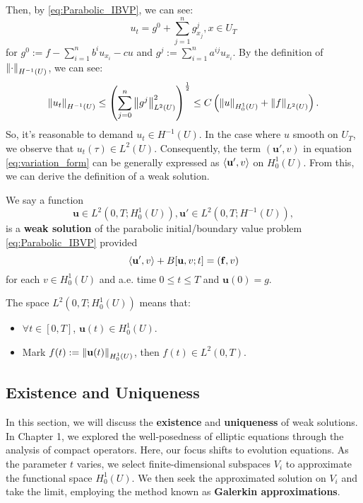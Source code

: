 Then, by \eqref{eq:Parabolic_IBVP}, we can see:
\begin{equation}
    u_{t}=g^{0}+\sum_{j=1}^{n}g_{x_{j}}^{j},x\in U_{T}
\end{equation}
for $g^{0}:=f-\sum_{i=1}^{n}b^{i}u_{x_{i}}-cu$ and $g^{j}:=\sum_{i=1}^{n}a^{ij}u_{x_{i}}$. By the definition of $\left\|\cdot\right\|_{H^{-1}(U)}$, we can see:
\begin{equation}
    \left\|u_{t}\right\|_{H^{-1}(U)}\le\left(\sum_{j=0}^{n}\left\|g^{j}\right\|_{L^{2}(U)}^{2}\right)^{\frac{1}{2}}\le C\left(\left\|u\right\|_{H_{0}^{1}(U)}+\left\|f\right\|_{L^{2}(U)}\right).
\end{equation}
So, it's reasonable to demand $u_{t}\in H^{-1}(U)$. In the case where $u$ smooth on $U_{T}$, we observe that $u_{t}(\tau)\in L^{2}(U)$. Consequently, the term $(\mathbf{u}',v)$ in equation \eqref{eq:variation_form} can be generally expressed as $\left<\mathbf{u}',v\right>$ on $H_{0}^{1}(U)$. From this, we can derive the definition of a weak solution.
\begin{definition}
    \label{defn:weak_sol_for_parabolic}
    We say a function 
    \begin{equation}
        \mathbf{u}\in L^{2}(0,T;H_{0}^{1}(U)),\mathbf{u}'\in L^{2}(0,T;H^{-1}(U)),
    \end{equation}
    is a \textbf{weak solution} of the parabolic initial/boundary value problem \eqref{eq:Parabolic_IBVP} provided 
    \begin{equation}
        \label{eq:variation_func}
        \left<\mathbf{u}',v\right>+B[\mathbf{u},v;t]=(\mathbf{f},v)
    \end{equation}
    for each $v\in H_{0}^{1}(U)$ and a.e. time $0\le t\le T$ and $\mathbf{u}(0)=g$.
\end{definition}
\begin{remark}
    The space $L^{2}(0,T;H_{0}^{1}(U))$ means that:
    \begin{itemize}
        \item $\forall t\in [0,T]$, $\mathbf{u}(t)\in H_{0}^{1}(U)$.
        \item Mark $f(t):=\left\|\mathbf{u}(t)\right\|_{H_{0}^{1}(U)}$, then $f(t)\in L^{2}(0,T)$.
    \end{itemize}
\end{remark}
\subsection{Existence and Uniqueness}
In this section, we will discuss the \textbf{existence} and \textbf{uniqueness} of weak solutions. In Chapter 1, we explored the well-posedness of elliptic equations through the analysis of compact operators. Here, our focus shifts to evolution equations. As the parameter $t$ varies, we select finite-dimensional subspaces $V_{i}$ to approximate the functional space $H_{0}^{1}(U)$. We then seek the approximated solution on $V_{i}$ and take the limit, employing the method known as \textbf{Galerkin approximations}.

